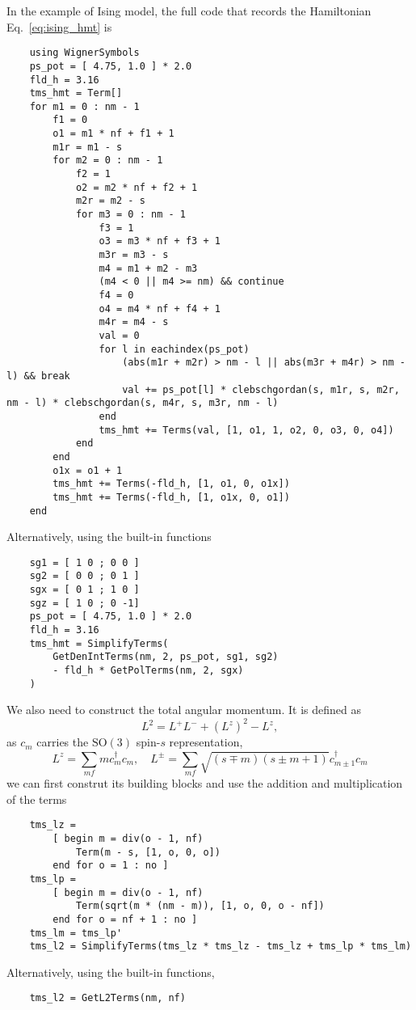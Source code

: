 \documentclass{timesjhep}
\begin{document}
In the example of Ising model, the full code that records the Hamiltonian Eq.~\eqref{eq:ising_hmt} is 
\begin{lstlisting}
    using WignerSymbols
    ps_pot = [ 4.75, 1.0 ] * 2.0
    fld_h = 3.16
    tms_hmt = Term[]
    for m1 = 0 : nm - 1
        f1 = 0
        o1 = m1 * nf + f1 + 1
        m1r = m1 - s
        for m2 = 0 : nm - 1
            f2 = 1
            o2 = m2 * nf + f2 + 1
            m2r = m2 - s
            for m3 = 0 : nm - 1
                f3 = 1
                o3 = m3 * nf + f3 + 1
                m3r = m3 - s
                m4 = m1 + m2 - m3 
                (m4 < 0 || m4 >= nm) && continue
                f4 = 0
                o4 = m4 * nf + f4 + 1
                m4r = m4 - s
                val = 0
                for l in eachindex(ps_pot)
                    (abs(m1r + m2r) > nm - l || abs(m3r + m4r) > nm - l) && break 
                    val += ps_pot[l] * clebschgordan(s, m1r, s, m2r, nm - l) * clebschgordan(s, m4r, s, m3r, nm - l)
                end 
                tms_hmt += Terms(val, [1, o1, 1, o2, 0, o3, 0, o4])
            end
        end
        o1x = o1 + 1
        tms_hmt += Terms(-fld_h, [1, o1, 0, o1x])
        tms_hmt += Terms(-fld_h, [1, o1x, 0, o1])
    end
\end{lstlisting}
Alternatively, using the built-in functions
\begin{lstlisting}
    sg1 = [ 1 0 ; 0 0 ]
    sg2 = [ 0 0 ; 0 1 ]
    sgx = [ 0 1 ; 1 0 ]
    sgz = [ 1 0 ; 0 -1]
    ps_pot = [ 4.75, 1.0 ] * 2.0
    fld_h = 3.16
    tms_hmt = SimplifyTerms(
        GetDenIntTerms(nm, 2, ps_pot, sg1, sg2)
        - fld_h * GetPolTerms(nm, 2, sgx) 
    )
\end{lstlisting}

We also need to construct the total angular momentum. It is defined as 
\begin{equation}
    L^2=L^+L^-+(L^z)^2-L^z,
\end{equation}
as $c_m$ carries the $\mathrm{SO}(3)$ spin-$s$ representation, 
\begin{equation}
    L^z=\sum_{mf}mc_m^\dagger c_m,\quad L^\pm=\sum_{mf}\sqrt{(s\mp m)(s\pm m+1)}c^\dagger_{m\pm 1}c_m
\end{equation}
we can first construt its building blocks and use the addition and multiplication of the terms
\begin{lstlisting}
    tms_lz = 
        [ begin m = div(o - 1, nf)
            Term(m - s, [1, o, 0, o])
        end for o = 1 : no ]
    tms_lp = 
        [ begin m = div(o - 1, nf)
            Term(sqrt(m * (nm - m)), [1, o, 0, o - nf])
        end for o = nf + 1 : no ]
    tms_lm = tms_lp' 
    tms_l2 = SimplifyTerms(tms_lz * tms_lz - tms_lz + tms_lp * tms_lm)
\end{lstlisting}
Alternatively, using the built-in functions,
\begin{lstlisting}
    tms_l2 = GetL2Terms(nm, nf)
\end{lstlisting}
\end{document}
